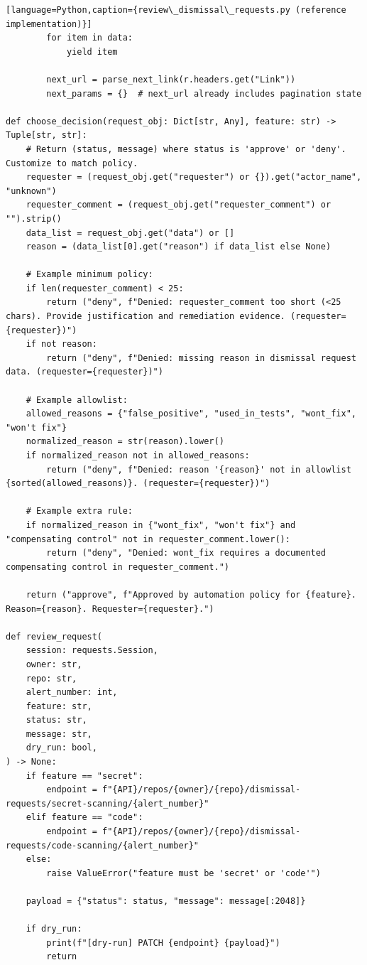 \documentclass[11pt]{article}
\begin{document}
\begin{verbatim}[language=Python,caption={review\_dismissal\_requests.py (reference implementation)}]
        for item in data:
            yield item

        next_url = parse_next_link(r.headers.get("Link"))
        next_params = {}  # next_url already includes pagination state

def choose_decision(request_obj: Dict[str, Any], feature: str) -> Tuple[str, str]:
    # Return (status, message) where status is 'approve' or 'deny'. Customize to match policy.
    requester = (request_obj.get("requester") or {}).get("actor_name", "unknown")
    requester_comment = (request_obj.get("requester_comment") or "").strip()
    data_list = request_obj.get("data") or []
    reason = (data_list[0].get("reason") if data_list else None)

    # Example minimum policy:
    if len(requester_comment) < 25:
        return ("deny", f"Denied: requester_comment too short (<25 chars). Provide justification and remediation evidence. (requester={requester})")
    if not reason:
        return ("deny", f"Denied: missing reason in dismissal request data. (requester={requester})")

    # Example allowlist:
    allowed_reasons = {"false_positive", "used_in_tests", "wont_fix", "won't fix"}
    normalized_reason = str(reason).lower()
    if normalized_reason not in allowed_reasons:
        return ("deny", f"Denied: reason '{reason}' not in allowlist {sorted(allowed_reasons)}. (requester={requester})")

    # Example extra rule:
    if normalized_reason in {"wont_fix", "won't fix"} and "compensating control" not in requester_comment.lower():
        return ("deny", "Denied: wont_fix requires a documented compensating control in requester_comment.")

    return ("approve", f"Approved by automation policy for {feature}. Reason={reason}. Requester={requester}.")

def review_request(
    session: requests.Session,
    owner: str,
    repo: str,
    alert_number: int,
    feature: str,
    status: str,
    message: str,
    dry_run: bool,
) -> None:
    if feature == "secret":
        endpoint = f"{API}/repos/{owner}/{repo}/dismissal-requests/secret-scanning/{alert_number}"
    elif feature == "code":
        endpoint = f"{API}/repos/{owner}/{repo}/dismissal-requests/code-scanning/{alert_number}"
    else:
        raise ValueError("feature must be 'secret' or 'code'")

    payload = {"status": status, "message": message[:2048]}

    if dry_run:
        print(f"[dry-run] PATCH {endpoint} {payload}")
        return


\end{verbatim}
\end{document}

